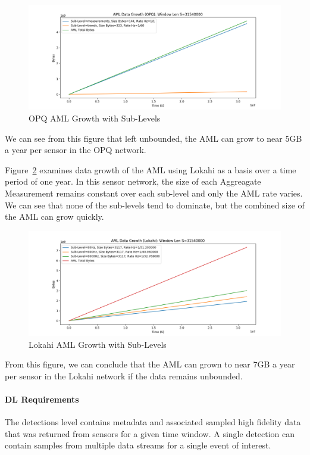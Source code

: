 \begin{figure}[H]
	\centering
	\includegraphics[width=\linewidth]{figures/plot_aml_level_opq_single.png}
	\caption{OPQ AML Growth with Sub-Levels}
	\label{fig:plot_aml_level_opq_single}
\end{figure}

We can see from this figure that left unbounded, the AML can grow to near 5GB a year per sensor in the OPQ network.

Figure~\ref{fig:plot_aml_level_lokahi_single} examines data growth of the AML using Lokahi as a basis over a time period of one year. In this sensor network, the size of each Aggreagate Measurement remains constant over each sub-level and only the AML rate varies. We can see that none of the sub-levels tend to dominate, but the combined size of the AML can grow quickly.

\begin{figure}[H]
	\centering
	\includegraphics[width=\linewidth]{figures/plot_aml_level_lokahi_single.png}
	\caption{Lokahi AML Growth with Sub-Levels}
	\label{fig:plot_aml_level_lokahi_single}
\end{figure}

From this figure, we can conclude that the AML can grown to near 7GB a year per sensor in the Lokahi network if the data remains unbounded.

\paragraph{DL Requirements}
The detections level contains metadata and associated sampled high fidelity data that was returned from sensors for a given time window. A single detection can contain samples from multiple data streams for a single event of interest.

